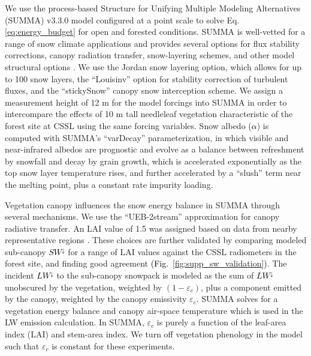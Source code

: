 \documentclass[draft]{agujournal2019}
\newcommand{\fig}[2]{\textcolor{black}{(Fig.~\ref{#1}{#2})}}   %
\newcommand{\lwdn}{\textcolor{black}{$LW^{\downarrow}$}\xspace}
\newcommand{\swdn}{\textcolor{black}{$SW^{\downarrow}$}\xspace}
\newcommand{\albedo}{\textcolor{black}{$\alpha$}\xspace}
\begin{document}
We use the process-based Structure for Unifying Multiple Modeling Alternatives (SUMMA) v3.3.0 model \cite{Clark2015-ni} configured at a point scale to solve Eq. \ref{eq:energy_budget} for open and forested conditions.
SUMMA is well-vetted for a range of snow climate applications and provides several options for flux stability corrections, canopy radiation transfer, snow-layering schemes, and other model structural options \cite{Cristea2022-ys}.
We use the Jordan snow layering option, which allows for up to 100 snow layers, the ``Louisinv'' option for stability correction of turbulent fluxes, and the ``stickySnow'' canopy snow interception scheme.
We assign a measurement height of 12 m for the model forcings into SUMMA in order to intercompare the effects of 10 m tall needleleaf vegetation characteristic of the forest site at CSSL using the same forcing variables.
Snow albedo (\albedo) is computed with SUMMA's ``varDecay'' parameterization, in which visible and near-infrared albedos are prognostic and evolve as a balance between refreshment by snowfall and decay by grain growth, which is accelerated exponentially as the top snow layer temperature rises, and further accelerated by a ``slush'' term near the melting point, plus a constant rate impurity loading. 

Vegetation canopy influences the snow energy balance in SUMMA through several mechanisms.
We use the ``UEB-2stream'' approximation for canopy radiative transfer.
An LAI value of 1.5 was assigned based on data from nearby representative regions \cite{Krogh2020-dh}.
These choices are further validated by comparing modeled sub-canopy \swdn for a range of LAI values against the CSSL radiometers in the forest site, and finding good agreement \fig{fig:supp_sw_validation}{}.
The incident \lwdn to the sub-canopy snowpack is modeled as the sum of \lwdn unobscured by the vegetation, weighted by $(1-\varepsilon_c)$, plus a component emitted by the canopy, weighted by the canopy emissivity $\varepsilon_c$.
SUMMA solves for a vegetation energy balance and canopy air-space temperature which is used in the LW emission calculation.
In SUMMA, $\varepsilon_c$ is purely a function of the leaf-area index (LAI) and stem-area index.
We turn off vegetation phenology in the model such that $\varepsilon_c$ is constant for these experiments.

\end{document}
